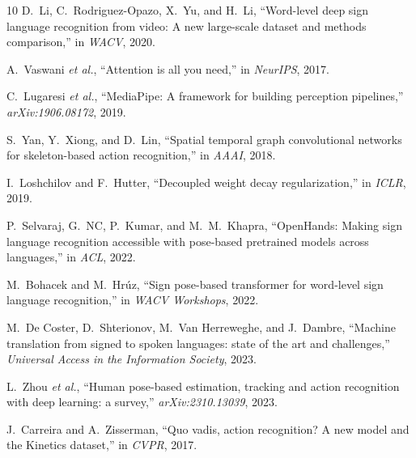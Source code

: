 \documentclass[11pt,a4paper]{article}
\begin{document}

\begin{thebibliography}{10}
D.~Li, C.~Rodriguez-Opazo, X.~Yu, and H.~Li, ``Word-level deep sign language recognition from video: A new large-scale dataset and methods comparison,'' in \emph{WACV}, 2020.

A.~Vaswani \emph{et al.}, ``Attention is all you need,'' in \emph{NeurIPS}, 2017.

C.~Lugaresi \emph{et al.}, ``MediaPipe: A framework for building perception pipelines,'' \emph{arXiv:1906.08172}, 2019.

S.~Yan, Y.~Xiong, and D.~Lin, ``Spatial temporal graph convolutional networks for skeleton-based action recognition,'' in \emph{AAAI}, 2018.

I.~Loshchilov and F.~Hutter, ``Decoupled weight decay regularization,'' in \emph{ICLR}, 2019.

P.~Selvaraj, G.~NC, P.~Kumar, and M.~M.~Khapra, ``OpenHands: Making sign language recognition accessible with pose-based pretrained models across languages,'' in \emph{ACL}, 2022.

M.~Bohacek and M.~Hr\'uz, ``Sign pose-based transformer for word-level sign language recognition,'' in \emph{WACV Workshops}, 2022.

M.~De Coster, D.~Shterionov, M.~Van Herreweghe, and J.~Dambre, ``Machine translation from signed to spoken languages: state of the art and challenges,'' \emph{Universal Access in the Information Society}, 2023.

L.~Zhou \emph{et al.}, ``Human pose-based estimation, tracking and action recognition with deep learning: a survey,'' \emph{arXiv:2310.13039}, 2023.

J.~Carreira and A.~Zisserman, ``Quo vadis, action recognition? A new model and the Kinetics dataset,'' in \emph{CVPR}, 2017.
\end{thebibliography}
\end{document}
